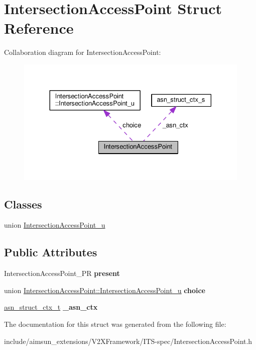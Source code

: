 \hypertarget{structIntersectionAccessPoint}{}\section{Intersection\+Access\+Point Struct Reference}
\label{structIntersectionAccessPoint}


Collaboration diagram for Intersection\+Access\+Point\+:\nopagebreak
\begin{figure}[H]
\begin{center}
\leavevmode
\includegraphics[width=330pt]{structIntersectionAccessPoint__coll__graph}
\end{center}
\end{figure}
\subsection*{Classes}
\begin{DoxyCompactItemize}
\item 
union \hyperlink{unionIntersectionAccessPoint_1_1IntersectionAccessPoint__u}{Intersection\+Access\+Point\+\_\+u}
\end{DoxyCompactItemize}
\subsection*{Public Attributes}
\begin{DoxyCompactItemize}
\item 
Intersection\+Access\+Point\+\_\+\+PR {\bfseries present}\hypertarget{structIntersectionAccessPoint_a42a83990bcfb2f40189061e8f38d7378}{}\label{structIntersectionAccessPoint_a42a83990bcfb2f40189061e8f38d7378}

\item 
union \hyperlink{unionIntersectionAccessPoint_1_1IntersectionAccessPoint__u}{Intersection\+Access\+Point\+::\+Intersection\+Access\+Point\+\_\+u} {\bfseries choice}\hypertarget{structIntersectionAccessPoint_ae59d7e0c3ada16fcb4c7a7f4de9c80b3}{}\label{structIntersectionAccessPoint_ae59d7e0c3ada16fcb4c7a7f4de9c80b3}

\item 
\hyperlink{structasn__struct__ctx__s}{asn\+\_\+struct\+\_\+ctx\+\_\+t} {\bfseries \+\_\+asn\+\_\+ctx}\hypertarget{structIntersectionAccessPoint_ad3b612a2820c2348466f79d3b5dc56e2}{}\label{structIntersectionAccessPoint_ad3b612a2820c2348466f79d3b5dc56e2}

\end{DoxyCompactItemize}


The documentation for this struct was generated from the following file\+:\begin{DoxyCompactItemize}
\item 
include/aimsun\+\_\+extensions/\+V2\+X\+Framework/\+I\+T\+S-\/spec/Intersection\+Access\+Point.\+h\end{DoxyCompactItemize}
